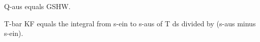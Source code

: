 Q-aus equals GSHW.  

T-bar KF equals the integral from s-ein to s-aus of T ds divided by (s-aus minus s-ein).